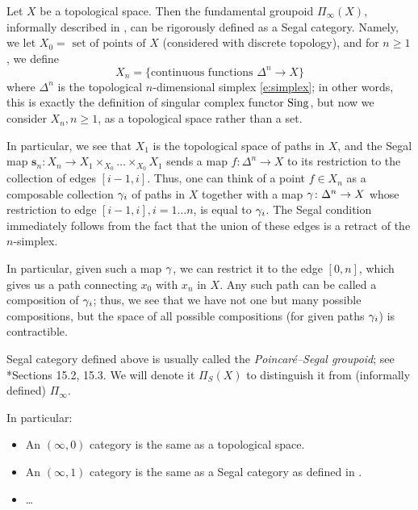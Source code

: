 \begin{example}\label{x:poincare-segal}
  Let $X$ be a topological space. Then the fundamental groupoid
  $\Pi_{\infty}(X)$, informally described in ,
  can be rigorously defined as a Segal category. Namely, we let
  $X_0=\text{ set of points of $X$}$ (considered with discrete topology),
  and for $n\ge 1$, we define
  $$
    X_n= \{\text{continuous functions $\Delta^n\to X$}\}
  $$
  where $\Delta^n$ is the topological $n$-dimensional simplex \eqref{e:simplex};
  in other words, this is exactly the definition of singular complex functor
  $\operatorname{Sing}$, but now we consider $X_n, n\ge 1$, as a topological space rather
  than a set.

  In particular, we see that $X_1$ is the topological space of paths in $X$,
  and the Segal map $\mathbf{s}_n\colon X_n \to X_1\times_{X_0}\dots\times_{X_0}
  X_1$ sends a map $f\colon \Delta^n\to X$ to its restriction to the collection
  of edges $[i-1, i]$. Thus, one can think of a point $f\in X_n$ as a composable
  collection $\gamma_i$ of paths in $X$ together with a map $\gamma \colon
  \Delta^n\to X$ whose restriction to edge $[i-1, i], i=1\dots n$, is equal to
  $\gamma_i$. The Segal condition immediately follows from the fact that the union of
  these edges is a retract of the $n$-simplex.

  In particular, given such a map $\gamma$, we can restrict it to the edge $[0,n]$,
  which gives us a path connecting $x_0$ with $x_n$ in $X$. Any such path can be
  called a composition of $\gamma_i$; thus, we see that we have not one but many
  possible compositions, but the space of all possible compositions (for given
  paths $\gamma_i$) is contractible.

  Segal category defined above is usually called the \emph{Poincar\'e--Segal
  groupoid}; see *{Sections 15.2, 15.3}. We will denote it
  $\Pi_S(X)$ to distinguish it from (informally defined) $\Pi_{\infty}$.

\end{example}


In particular:
\begin{itemize}
  \item An $(\infty, 0)$ category is the same as a topological space.
  \item An $(\infty, 1)$ category is the same as a Segal category as defined
    in .
  \item \dots
\end{itemize}

